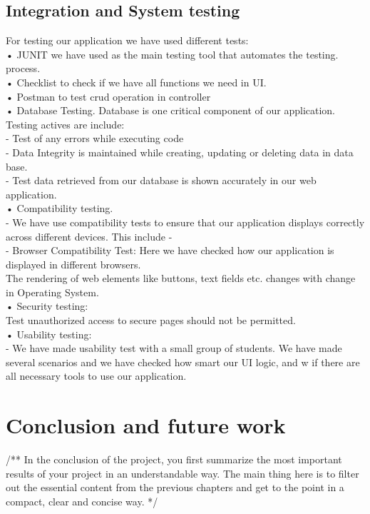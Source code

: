 \documentclass{scrartcl}
\begin{document}
\subsection{Integration and System testing}
For testing  our application we have used different tests:\\
• JUNIT we have used as the main testing tool that automates the testing.\\ process.\\
• Checklist to check if we have all functions we need in UI.\\
• Postman to test crud operation in controller\\
• Database Testing. Database is one critical component of our application. Testing actives are include:\\
 - Test of any errors while executing code\\
 - Data Integrity is maintained while creating, updating or deleting data in data base.\\
 - Test data retrieved from our database is shown accurately in our web application.\\
• Compatibility testing.\\
 - We have use compatibility tests to ensure that our application displays correctly across different devices. This include -\\
 - Browser Compatibility Test: Here we have checked how our application is displayed in different browsers.\\
   The rendering of web elements like buttons, text fields etc. changes with change in Operating System.\\
• Security testing: \\
   Test unauthorized access to secure pages should not be permitted.\\
• Usability testing:\\
  - We have made usability test with a small group of students. We have made several scenarios and we have checked how smart our UI logic, and w if there are all necessary tools to use our application.\\



\section{Conclusion and future work}
/**
 In the conclusion of the project, you first summarize the most important results of your project in an understandable way. The main thing here is to filter out the essential content from the previous chapters and get to the point in a compact, clear and concise way.
*/
\end{document}
